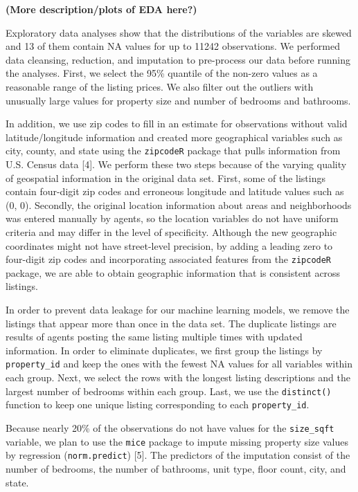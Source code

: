 \documentclass[10pt,letterpaper]{article}
\begin{document}
\textbf{(More description/plots of EDA here?)}

Exploratory data analyses show that the distributions of the variables
are skewed and 13 of them contain NA values for up to 11242
observations. We performed data cleansing, reduction, and imputation to
pre-process our data before running the analyses. First, we select the
95\% quantile of the non-zero values as a reasonable range of the
listing prices. We also filter out the outliers with unusually large
values for property size and number of bedrooms and bathrooms.

In addition, we use zip codes to fill in an estimate for observations
without valid latitude/longitude information and created more
geographical variables such as city, county, and state using the
\texttt{zipcodeR} package that pulls information from U.S. Census data
{[}4{]}. We perform these two steps because of the varying quality of
geospatial information in the original data set. First, some of the
listings contain four-digit zip codes and erroneous longitude and
latitude values such as (0, 0). Secondly, the original location
information about areas and neighborhoods was entered manually by
agents, so the location variables do not have uniform criteria and may
differ in the level of specificity. Although the new geographic
coordinates might not have street-level precision, by adding a leading
zero to four-digit zip codes and incorporating associated features from
the \texttt{zipcodeR} package, we are able to obtain geographic
information that is consistent across listings.

In order to prevent data leakage for our machine learning models, we
remove the listings that appear more than once in the data set. The
duplicate listings are results of agents posting the same listing
multiple times with updated information. In order to eliminate
duplicates, we first group the listings by \texttt{property\_id} and
keep the ones with the fewest NA values for all variables within each
group. Next, we select the rows with the longest listing descriptions
and the largest number of bedrooms within each group. Last, we use the
\texttt{distinct()} function to keep one unique listing corresponding to
each \texttt{property\_id}.

Because nearly 20\% of the observations do not have values for the
\texttt{size\_sqft} variable, we plan to use the \texttt{mice} package
to impute missing property size values by regression
(\texttt{norm.predict}) {[}5{]}. The predictors of the imputation
consist of the number of bedrooms, the number of bathrooms, unit type,
floor count, city, and state.
\end{document}
